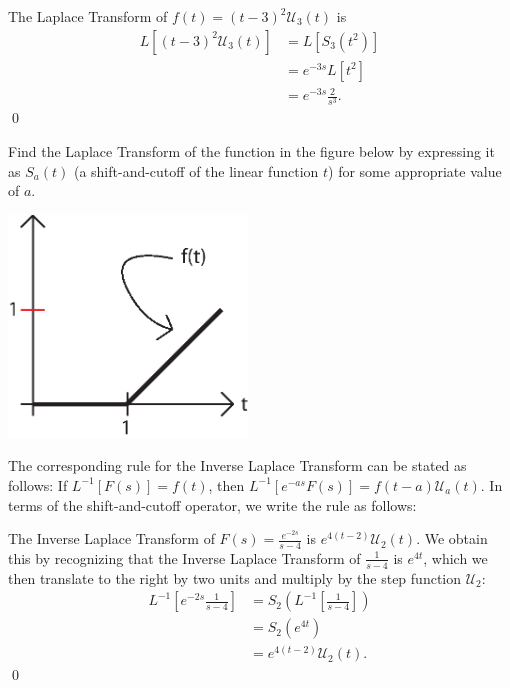 {{\example The Laplace Transform of $f(t)=(t-3)^2\mathcal{U}_3 (t)$ is
\begin{align*}
L[(t-3)^2\mathcal{U}_3(t)] & = L[S_3 \left( t^2 \right)] \\
& = e^{-3s}L[t^2] \\
& = e^{-3s} \frac{2}{s^3}.
\end{align*}
\qed

\begin{exe}
Find the Laplace Transform of the function in the figure below by expressing it as $S_a(t)$ (a shift-and-cutoff of the linear function $t$) for some appropriate value of $a$.
\begin{center}
\includegraphics[width=2.5in]{11-laplaceII/figure1.eps}
\end{center}
\end{exe}


The corresponding rule for the Inverse Laplace Transform can be stated as follows: If $L^{-1}[F(s)]=f(t)$, then $L^{-1}[e^{-as}F(s)] = f(t-a)\mathcal{U}_a(t)$.  In terms of the shift-and-cutoff operator, we write the rule as follows:
{\begin{center}
\end{center}


\example The Inverse Laplace Transform of $F(s)=\frac{e^{-2s}}{s-4}$ is $e^{4(t-2)}\mathcal{U}_2(t)$.  We obtain this by recognizing that the Inverse Laplace Transform of $\frac{1}{s-4}$ is $e^{4t}$, which we then translate to the right by two units and multiply by the step function $\mathcal{U}_2$:
\begin{align*}
L^{-1} \left[e^{-2s}\frac{1}{s-4} \right] & = S_2 \left( L^{-1} \left[ \frac{1}{s-4} \right] \right) \\
& = S_2 \left( e^{4t} \right) \\
& = e^{4(t-2)}\mathcal{U}_2(t).
\end{align*}
\qed

}}}
